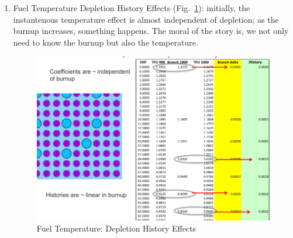 \documentclass{school-22.211-notes}
\begin{document}
\begin{enumerate}
\item Fuel Temperature Depletion History Effects (Fig.~\ref{dhe}): initially, the instantenous temperature effect is almost independent of depletion; as the burnup increases, something happens. The moral of the story is, we not only need to know the burnup but also the temperature. 
  \begin{figure}
    \centering
    \includegraphics[width=5in]{images/dfs/depletion-history-effect.png}
    \caption{Fuel Temperature: Depletion History Effects}  \label{dhe}
  \end{figure}


\end{enumerate}
\end{document}
